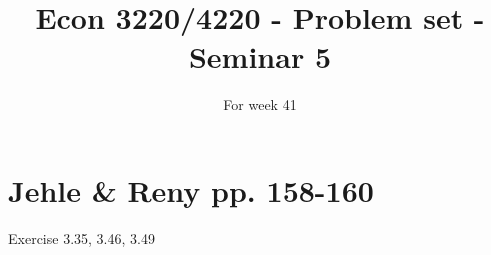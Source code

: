 \documentclass{article}
\title{Econ 3220/4220 - Problem set - Seminar 5 }
\date{For week 41}
\begin{document}
\maketitle


\section*{Jehle \& Reny pp. 158-160}

Exercise 3.35, 3.46, 3.49
\end{document}
